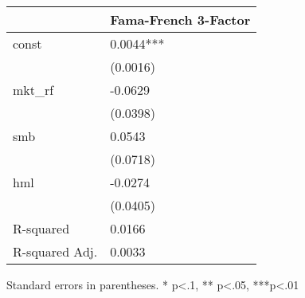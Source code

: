 \begin{table}
\caption{}
\label{}
\begin{center}
\begin{tabular}{ll}
\hline
               & Fama-French 3-Factor  \\
\hline
const          & 0.0044***             \\
               & (0.0016)              \\
mkt\_rf        & -0.0629               \\
               & (0.0398)              \\
smb            & 0.0543                \\
               & (0.0718)              \\
hml            & -0.0274               \\
               & (0.0405)              \\
R-squared      & 0.0166                \\
R-squared Adj. & 0.0033                \\
\hline
\end{tabular}
\end{center}
\end{table}
\bigskip
Standard errors in parentheses. \newline 
* p<.1, ** p<.05, ***p<.01
